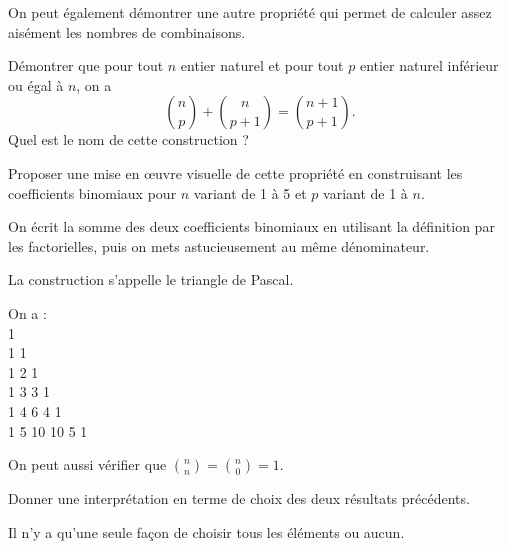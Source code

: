 \documentclass[12pt,a4paper,french]{article}
\theoremstyle{break}
\theoremstyle{plain}
\theoremstyle{nonumberplain}
\theoremstyle{nonumberbreak}
\begin{document}
On peut également démontrer une autre propriété qui permet de calculer
assez aisément les nombres de combinaisons.

\begin{question}[ID=pascal]
  Démontrer que pour tout $n$ entier naturel et pour tout $p$ entier
  naturel inférieur ou égal à $n$, on a \[ \binom{n}{p} + \binom{n}{p+1}
  = \binom{n+1}{p+1}. \] Quel est le nom de cette construction ?

  Proposer une mise en œuvre visuelle de cette propriété en construisant
  les coefficients binomiaux pour $n$ variant de 1 à 5 et $p$ variant de
  1 à $n$.
\end{question}
\begin{solution}
  On écrit la somme des deux coefficients binomiaux en utilisant la
  définition par les factorielles, puis on mets astucieusement au même
  dénominateur.

  La construction s'appelle le triangle de Pascal.

  On a :\\
  1 \\
  1 \hspace{1em} 1 \\
  1 \hspace{1em} 2 \hspace{1em} 1 \\
  1 \hspace{1em} 3 \hspace{1em} 3 \hspace{1em} 1 \\
  1 \hspace{1em} 4 \hspace{1em} 6 \hspace{1em} 4 \hspace{1em} 1 \\
  1 \hspace{1em} 5 \hspace{1em} 10 \hspace{0.5em} 10 \hspace{0.5em} 5
  \hspace{1em} 1
\end{solution}

On peut aussi vérifier que $\binom{n}{n} = \binom{n}{0} = 1$.

\begin{question}[ID=1choix]
  Donner une interprétation en terme de choix des deux résultats
  précédents.
\end{question}
\begin{solution}
  Il n'y a qu'une seule façon de choisir tous les éléments ou aucun.
\end{solution}
\end{document}
